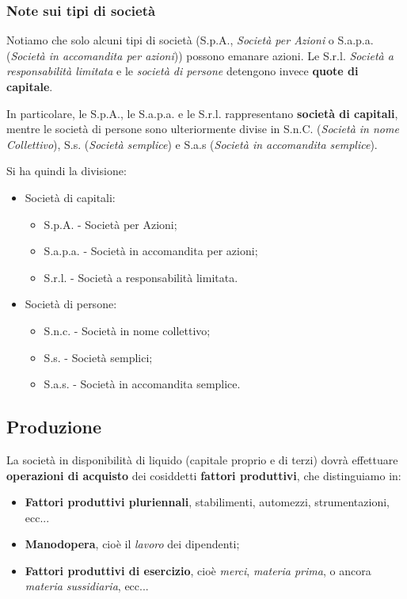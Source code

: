 \documentclass[a4paper,11pt]{article}
\begin{document}
\subsubsection{Note sui tipi di società}
Notiamo che solo alcuni tipi di società (S.p.A., \textit{Società per Azioni} o S.a.p.a. (\textit{Società in accomandita per azioni})) possono emanare azioni.
Le S.r.l. \textit{Società a responsabilità limitata} e le \textit{società di persone} detengono invece \textbf{quote di capitale}.

In particolare, le S.p.A., le S.a.p.a. e le S.r.l. rappresentano \textbf{società di capitali}, mentre le società di persone sono ulteriormente divise in S.n.C. (\textit{Società in nome Collettivo}), S.s. (\textit{Società semplice}) e S.a.s (\textit{Società in accomandita semplice}).

Si ha quindi la divisione:
\begin{itemize}
	\item Società di capitali:
		\begin{itemize}
			\item S.p.A. - Società per Azioni;
			\item S.a.p.a. - Società in accomandita per azioni;
			\item S.r.l. - Società a responsabilità limitata.
		\end{itemize}
	\item Società di persone:
		\begin{itemize}
			\item S.n.c. - Società in nome collettivo;
			\item S.s. - Società semplici;
			\item S.a.s. - Società in accomandita semplice.
		\end{itemize}
\end{itemize}

\subsection{Produzione}
La società in disponibilità di liquido (capitale proprio e di terzi) dovrà effettuare \textbf{operazioni di acquisto} dei cosiddetti \textbf{fattori produttivi}, che distinguiamo in:
\begin{itemize}
	\item \textbf{Fattori produttivi pluriennali}, stabilimenti, automezzi, strumentazioni, ecc...
	\item \textbf{Manodopera}, cioè il \textit{lavoro} dei dipendenti;
		\item \textbf{Fattori produttivi di esercizio}, cioè \textit{merci}, \textit{materia prima}, o ancora \textit{materia sussidiaria}, ecc...
\end{itemize}
\end{document}
